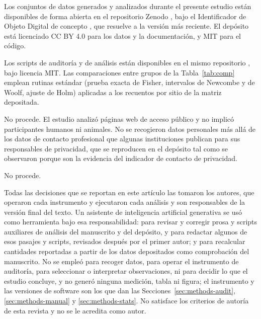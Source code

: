 \documentclass[pdflatex,sn-basic,Numbered,iicol]{sn-jnl}
\theoremstyle{thmstyleone}
\theoremstyle{thmstyletwo}
\theoremstyle{thmstylethree}
\begin{document}

Los conjuntos de datos generados y analizados durante el presente estudio est\'an disponibles de forma abierta en el repositorio Zenodo \citep{deposito2026}, bajo el Identificador de Objeto Digital de concepto , que resuelve a la versi\'on m\'as reciente. El dep\'osito est\'a licenciado CC BY 4.0 para los datos y la documentaci\'on, y MIT para el c\'odigo.


Los scripts de auditor\'ia y de an\'alisis est\'an disponibles en el mismo repositorio \citep{deposito2026}, bajo licencia MIT. Las comparaciones entre grupos de la Tabla~\ref{tab:comp} emplean rutinas est\'andar (prueba exacta de Fisher, intervalos de Newcombe y de Woolf, ajuste de Holm) aplicadas a los recuentos por sitio de la matriz depositada.


No procede. El estudio analiz\'o p\'aginas web de acceso p\'ublico y no implic\'o participantes humanos ni animales. No se recogieron datos personales m\'as all\'a de los datos de contacto profesional que algunas instituciones publican para sus responsables de privacidad, que se reproducen en el dep\'osito tal como se observaron porque son la evidencia del indicador de contacto de privacidad.

No procede.


Todas las decisiones que se reportan en este art\'iculo las tomaron los autores, que operaron cada instrumento y ejecutaron cada an\'alisis y son responsables de la versi\'on final del texto. Un asistente de inteligencia artificial generativa se us\'o como herramienta bajo esa responsabilidad: para revisar y corregir prosa y scripts auxiliares de an\'alisis del manuscrito y del dep\'osito, y para redactar algunos de esos pasajes y scripts, revisados despu\'es por el primer autor; y para recalcular cantidades reportadas a partir de los datos depositados como comprobaci\'on del manuscrito. No se emple\'o para recoger datos, para operar el instrumento de auditor\'ia, para seleccionar o interpretar observaciones, ni para decidir lo que el estudio concluye, y no gener\'o ninguna medici\'on, tabla ni figura; el instrumento y las versiones de software son los que dan las Secciones~\ref{sec:methods-audit}, \ref{sec:methods-manual} y \ref{sec:methods-stats}. No satisface los criterios de autor\'ia de esta revista y no se le acredita como autor.
\end{document}
